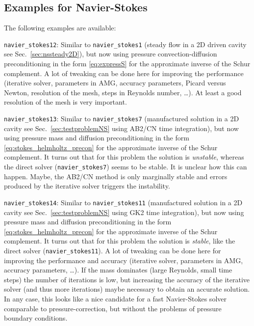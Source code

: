 \subsection{Examples for Navier-Stokes}
The following examples are available:
\begin{description}
\item{\texttt{navier\_stokes12}:} Similar to \texttt{navier\_stokes1}
 (steady flow in a 2D driven cavity see Sec.~\ref{sec:nssteady2D}),
but now using pressure convection-diffusion
preconditioning in the form \eqref{eq:expressS} for the approximate inverse of the Schur complement. A lot of tweaking can
be done here for improving the performance (iterative solver, parameters in AMG, accuracy parameters, Picard versus Newton,
resolution of the mesh, steps in Reynolds number, \ldots ). At least a good resolution of the mesh is very important.
\item{\texttt{navier\_stokes13}:} Similar to \texttt{navier\_stokes7}
(manufactured solution in a 2D cavity see Sec.~\ref{sec:testproblemNS} using
AB2/CN time integration),
but now using pressure mass and diffusion
preconditioning in the form \eqref{eq:stokes_helmholtz_precon}
for the approximate inverse of the Schur complement. It turns out that
for this problem the solution is \emph{unstable}, whereas the direct solver
(\texttt{navier\_stokes7}) seems to be stable. It is unclear how this can
happen. Maybe, the AB2/CN method is only marginally stable and
errors produced by the iterative solver triggers the instability.
\item{\texttt{navier\_stokes14}:} Similar to \texttt{navier\_stokes11}
(manufactured solution in a 2D cavity see Sec.~\ref{sec:testproblemNS} using
GK2 time integration),
but now using pressure mass and diffusion
preconditioning in the form \eqref{eq:stokes_helmholtz_precon}
for the approximate inverse of the Schur complement. It turns out that
for this problem the solution is \emph{stable}, like the direct solver
(\texttt{navier\_stokes11}). 
 A lot of tweaking can
be done here for improving the performance and accuracy (iterative solver,
parameters in AMG, accuracy parameters, \ldots ). If the mass dominates (large
Reynolds, small time steps) the number of iterations is low, but increasing the
accuracy of the iterative solver (and thus more iterations) maybe necessary to
obtain an accurate solution. In any case, this looks like a nice candidate for
a fast Navier-Stokes solver comparable to pressure-correction, but without the
problems of pressure boundary conditions.
\end{description}
